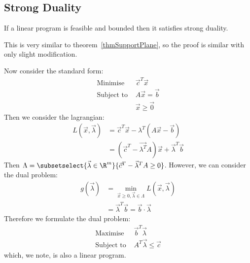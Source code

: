 \documentclass[../Main.tex]{subfiles}
\begin{document}
\subsection{Strong Duality}
\begin{theorem}
    If a linear program is feasible and bounded then it satisfies strong duality.
\end{theorem}
\begin{remark}
    This is very similar to theorem~\ref{thmSupportPlane}, so the proof is similar with only slight modification.
\end{remark}
Now consider the standard form:
\begin{align*}
    \text{Minimise } &\vec{c}^T \vec{x} \\
    \text{Subject to } &A\vec{x} = \vec{b} \\
    &\vec{x} \geq \vec{0}
\end{align*}
Then we consider the lagrangian:
\begin{align*}
    L(\vec{x}, \vec{\lambda}) &= \vec{c}^T \vec{x} - \lambda^T (A\vec{x} - \vec{b}) \\
    &= (\vec{c}^T - \vec{\lambda^T} A)\vec{x} + \vec{\lambda}^T \vec{b}
\end{align*}
Then $\Lambda = \subsetselect{\vec{\lambda} \in \R^m}{\vec{c}^T - \vec{\lambda}^T A \geq 0}$. However, we can consider the dual problem:
\begin{align*}
    g(\vec{\lambda}) &= \min_{\vec{x} \geq 0, \vec{\lambda} \in \Lambda} L(\vec{x}, \vec{\lambda}) \\
    &= \vec{\lambda}^T \vec{b} = \vec{b} \cdot \vec{\lambda}
\end{align*}
Therefore we formulate the dual problem:
\begin{align*}
    \text{Maximise } &\vec{b}^T \vec{\lambda} \\
    \text{Subject to } &A^T \vec{\lambda} \leq \vec{c}
\end{align*}
which, we note, is also a linear program.
\end{document}

